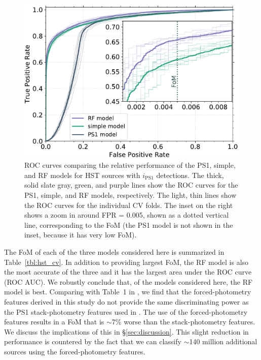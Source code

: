 \documentclass[twocolumn]{aastex63}
\begin{document}
\begin{figure}[t]
 \centering
  \includegraphics[width=\columnwidth]{./figures/CV_ROC_FHST.pdf}
  \caption{ ROC curves comparing the relative performance of the PS1, simple,
  and RF models for HST sources with $i_\mathrm{PS1}$ detections. The thick,
  solid slate gray, green, and purple lines show the ROC curves for the PS1,
  simple, and RF models, respectively. The light, thin lines show the ROC
  curves for the individual CV folds. The inset on the right shows a zoom in
  around FPR = 0.005, shown as a dotted vertical line, corresponding to the
  FoM (the PS1 model is not shown in the inset, because it has very low FoM).}
  \label{fig:hst_roc}
\end{figure}

The FoM of each of the three models considered here is summarized in
Table~\ref{tbl:hst_cv}. In addition to providing largest FoM, the RF model is
also the most accurate of the three and it has the largest area under the ROC
curve (ROC AUC). We robustly conclude that, of the models considered here, the
RF model is best. Comparing with Table~1 in \citet{Tachibana18}, we find that
the forced-photometry features derived in this study do not provide the same
discriminating power as the PS1 stack-photometry features used in
\citet{Tachibana18}. The use of the forced-photometry features results in a
FoM that is $\sim$7\% worse than the stack-photometry features. We discuss the
implications of this in \S\ref{sec:discussion}. This slight reduction in
performance is countered by the fact that we can classify $\sim$140 million
additional sources using the forced-photometry features.
\end{document}

